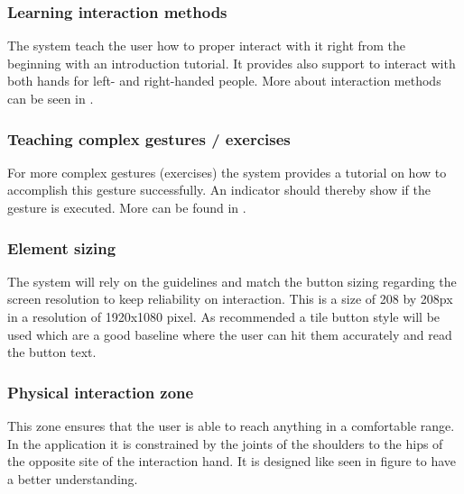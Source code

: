 \subsubsection{Learning interaction methods}
The system teach the user how to proper interact with it right from the beginning with an introduction tutorial. It provides also support to interact with both hands for left- and right-handed people. More about interaction methods can be seen in \textbf{}.

\subsubsection{Teaching complex gestures / exercises}
For more complex gestures (exercises) the system provides a tutorial on how to accomplish this gesture successfully. An indicator should thereby show if the gesture is executed. More can be found in \textbf{}.

\subsubsection{Element sizing}
The system will rely on the guidelines and match the button sizing regarding the screen resolution to keep reliability on interaction. This is a size of 208 by 208px in a resolution of 1920x1080 pixel. As recommended a tile button style will be used which are a good baseline where the user can hit them accurately and read the button text.

\subsubsection{Physical interaction zone}
This zone ensures that the user is able to reach anything in a comfortable range. In the application it is constrained by the joints of the shoulders to the hips of the opposite site of the interaction hand. It is designed like seen in figure  to have a better understanding.

